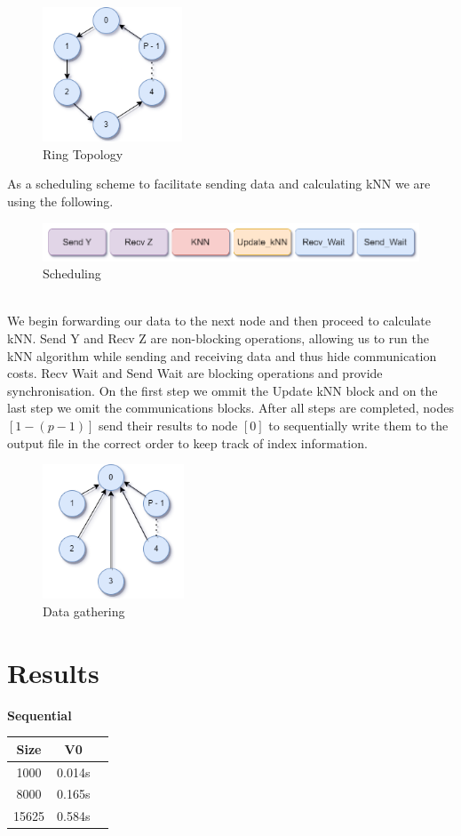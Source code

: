 \documentclass[12pt, letterpaper]{article}
\begin{document}
\begin{figure}[h]
    \centering
    \includegraphics[height=4cm]{ring.png}
    \caption{Ring Topology}
    \label{fig:img-1}
\end{figure}

As a scheduling scheme to facilitate sending data and calculating kNN we are using the following.
\begin{figure}[h]
    \centering
    \includegraphics[width=1\linewidth]{Flow diagram 2.png}
    \caption{Scheduling}
    \label{fig:img-2}
\end{figure}
\\
We begin forwarding our data to the next node and then proceed to calculate kNN.
Send Y and Recv Z are non-blocking operations, allowing us to run the kNN algorithm while sending and receiving data and thus hide communication costs. 
Recv Wait and Send Wait are blocking operations and provide synchronisation. On the first step we ommit the Update kNN block and on the last step we omit the communications blocks. 
After all steps are completed, nodes $[1 - (p-1)]$ send their results to node $[0]$ to sequentially write them to the output file in the correct order to keep track of index information.
\begin{figure}[h]
    \centering
    \includegraphics[height=4cm]{ring-many-to-1.png}
    \caption{Data gathering}
    \label{fig:img-3}
\end{figure}

\section{Results}
\textbf{Sequential}\\[0.5ex]
\begin{tabular}{|c|c|c|}
\hline
\textbf{Size} & \textbf{V0} \\ [0.5ex] 
\hline\hline
1000 & 0.014s  \\ 
\hline
8000 & 0.165s \\
\hline
15625 & 0.584s \\
\hline
\end{tabular}
\end{document}
